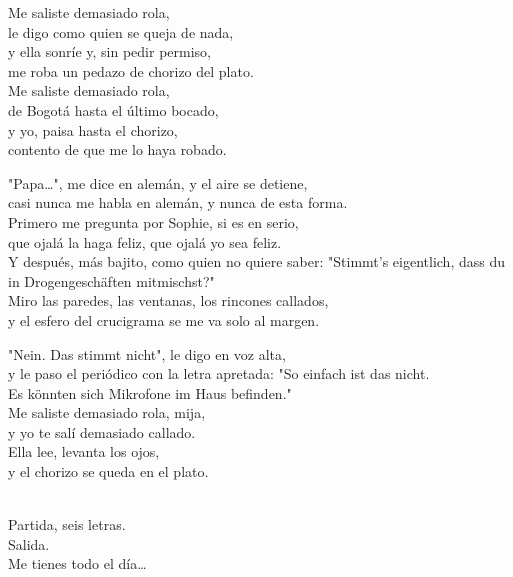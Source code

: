 \begin{lyrics}
Me saliste demasiado rola,\\
le digo como quien se queja de nada,\\
y ella sonríe y, sin pedir permiso,\\
me roba un pedazo de chorizo del plato.\\
Me saliste demasiado rola,\\
de Bogotá hasta el último bocado,\\
y yo, paisa hasta el chorizo,\\
contento de que me lo haya robado.

"Papa…", me dice en alemán, y el aire se detiene,\\
casi nunca me habla en alemán, y nunca de esta forma.\\
Primero me pregunta por Sophie, si es en serio,\\
que ojalá la haga feliz, que ojalá yo sea feliz.\\
Y después, más bajito, como quien no quiere saber:
"Stimmt's eigentlich, dass du in Drogengeschäften mitmischst?"\\
Miro las paredes, las ventanas, los rincones callados,\\
y el esfero del crucigrama se me va solo al margen.

"Nein. Das stimmt nicht", le digo en voz alta,\\
y le paso el periódico con la letra apretada:
"So einfach ist das nicht.\\
Es könnten sich Mikrofone im Haus befinden."\\
Me saliste demasiado rola, mija,\\
y yo te salí demasiado callado.\\
Ella lee, levanta los ojos,\\
y el chorizo se queda en el plato.

\\
Partida, seis letras.\\
Salida.\\
Me tienes todo el día…
\end{lyrics}

